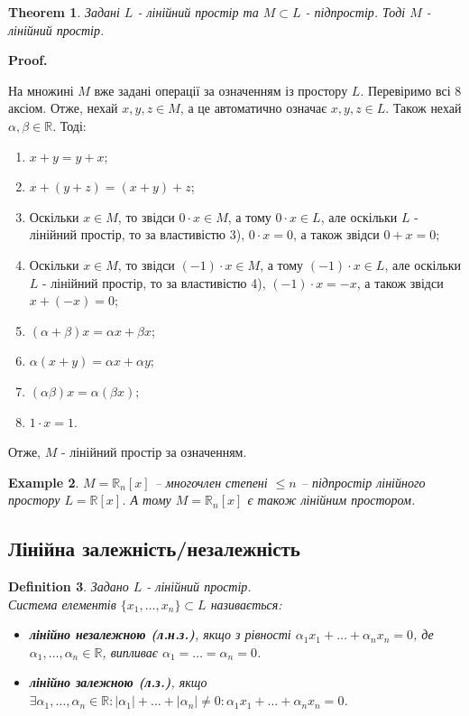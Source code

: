 \documentclass[a4paper, 10pt]{article}
\makeatletter
\theoremstyle{theoremdd}
\newtheorem{theorem}{Theorem}[subsection]
\newtheorem{definition}[theorem]{Definition}
\newtheorem{example}[theorem]{Example}
\renewenvironment{proof}[1][Proof.\\]{\par
\pushQED{\hfill \qed}%
\normalfont \topsep6\p@\@plus6\p@\relax
\trivlist
\item\relax
{\bfseries
#1\@addpunct{.}}\hspace\labelsep\ignorespaces
}{%
\popQED\endtrivlist\@endpefalse
}
\makeatother
\begin{document}
	\begin{theorem}
	Задані $L$ - лінійний простір та $M \subset L$ - підпростір. Тоді $M$ - лінійний простір.
	\end{theorem}
	
	\begin{proof}
	На множині $M$ вже задані операції за означенням із простору $L$. Перевіримо всі 8 аксіом. Отже, нехай $x,y,z \in M$, а це автоматично означає $x,y,z \in L$. Також нехай $\alpha,\beta \in \mathbb{R}$. Тоді:
	\begin{enumerate}[wide = 0pt, nosep, label={\arabic*)}]
	\item $x+y=y+x$;
	\item $x+(y+z)=(x+y)+z$;
	\item Оскільки $x \in M$, то звідси $0\cdot x \in M$, а тому $0 \cdot x \in L$, але оскільки $L$ - лінійний простір, то за властивістю 3), $0 \cdot x = 0$, а також звідси $0 + x = 0$;
	\item Оскільки $x \in M$, то звідси $(-1) \cdot x \in M$, а тому $(-1) \cdot x \in L$, але оскільки $L$ - лінійний простір, то за властивістю 4), $(-1) \cdot x = -x$, а також звідси $x + (-x) = 0$;
	\item $(\alpha + \beta)x = \alpha x + \beta x$;
	\item $\alpha (x+y)= \alpha x + \alpha y$;
	\item $(\alpha \beta) x = \alpha (\beta x)$;
	\item $1 \cdot x = 1$.
	\end{enumerate}
	Отже, $M$ - лінійний простір за означенням.
	\end{proof}

	\begin{example}	
		$M = \mathbb{R}_n[x]$ -- многочлен степені $\leq n$ -- підпростір лінійного простору $L = \mathbb{R}[x]$. А тому $M = \mathbb{R}_n[x]$ є також лінійним простором.
	\end{example}
	
	\subsection{Лінійна залежність/незалежність}
	\begin{definition}
	Задано $L$ - лінійний простір.\\
	Система елементів $\{x_1, \dots, x_n\} \subset L$ називається:
	\begin{itemize}[label={-}, nosep, wide=0pt]
	\item \textbf{лінійно незалежною (л.н.з.)}, якщо з рівності $\alpha_1 x_1 + \dots + \alpha_n x_n = 0$, де $\alpha_1, \dots, \alpha_n \in \mathbb{R}$, випливає $\alpha_1 = \dots = \alpha_n = 0$.
	\item \textbf{лінійно залежною (л.з.)}, якщо $\exists \alpha_1, \dots, \alpha_n \in \mathbb{R}: |\alpha_1| + \dots + |\alpha_n| \neq 0: \alpha_1 x_1 + \dots + \alpha_n x_n = 0$.
	\end{itemize}
	\end{definition}
	
\end{document}
